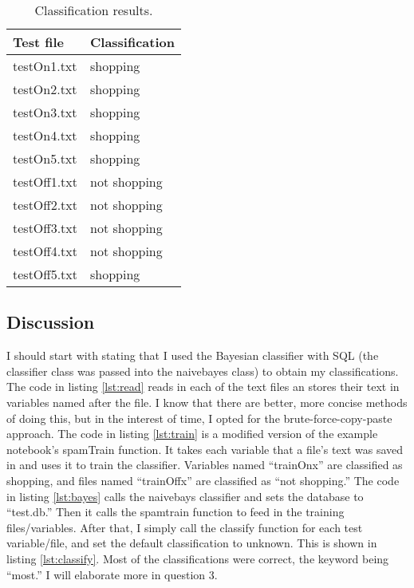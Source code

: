 \documentclass[12pt]{article}
\begin{document}
\begin{table}[h]
\centering
\caption{Classification results.}
\label{tbl:clresults}
\begin{tabular}{|l|l|}
\hline
\textbf{Test file} & \textbf{Classification} \\ \hline \hline
testOn1.txt & shopping \\ \hline
testOn2.txt & shopping \\ \hline
testOn3.txt & shopping \\ \hline
testOn4.txt & shopping \\ \hline
testOn5.txt & shopping \\ \hline
testOff1.txt & not shopping\\ \hline
testOff2.txt & not shopping\\ \hline
testOff3.txt & not shopping\\ \hline
testOff4.txt & not shopping\\ \hline
testOff5.txt & shopping\\ \hline
\end{tabular}
\end{table}

\subsection*{Discussion}
I should start with stating that I used the Bayesian classifier with SQL (the classifier class was passed into the naivebayes class) to obtain my classifications.  The code in listing \ref{lst:read} reads in each of the text files an stores their text in variables named after the file.  I know that there are better, more concise methods of doing this, but in the interest of time, I opted for the brute-force-copy-paste approach.  The code in listing \ref{lst:train} is a modified version of the example notebook's spamTrain function.  It takes each variable that a file's text was saved in and uses it to train the classifier.  Variables named ``trainOnx'' are classified as shopping, and files named ``trainOffx'' are classified as ``not shopping.''  The code in listing \ref{lst:bayes} calls the naivebays classifier and sets the database to ``test.db.''  Then it calls the spamtrain function to feed in the training files/variables.  After that, I simply call the classify function for each test variable/file, and set the default classification to unknown.  This is shown in listing \ref{lst:classify}.  Most of the classifications were correct, the keyword being ``most.'' I will elaborate more in question 3.
\end{document}
